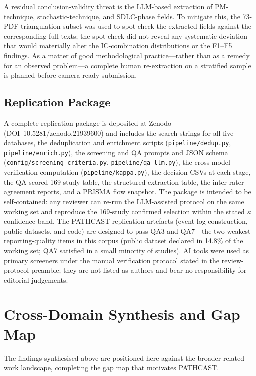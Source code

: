 A residual conclusion-validity threat is the LLM-based extraction of
PM-technique, stochastic-technique, and SDLC-phase fields. To mitigate this,
the 73-PDF triangulation subset was used to spot-check the extracted fields
against the corresponding full texts; the spot-check did not reveal any
systematic deviation that would materially alter the IC-combination
distributions or the F1--F5 findings. As a matter of good methodological
practice---rather than as a remedy for an observed problem---a complete
human re-extraction on a stratified sample is planned before camera-ready
submission.


\subsection{Replication Package}
\label{sec:slr-replication}

A complete replication package is deposited at Zenodo
(DOI~10.5281/zenodo.21939600)
and includes the search strings for all five databases, the deduplication and
enrichment scripts (\texttt{pipeline/dedup.py}, \texttt{pipeline/enrich.py}),
the screening and QA prompts and JSON schema
(\texttt{config/screening\_criteria.py}, \texttt{pipeline/qa\_llm.py}),
the cross-model verification computation (\texttt{pipeline/kappa.py}),
the decision CSVs at each stage, the QA-scored 169-study table, the
structured extraction table, the inter-rater agreement reports, and a
PRISMA flow snapshot. The package is intended to be self-contained: any
reviewer can re-run the LLM-assisted protocol on the same working set and
reproduce the 169-study confirmed selection within the stated $\kappa$
confidence band. The PATHCAST replication artefacts (event-log construction,
public datasets, and code) are designed to pass QA3 and QA7---the two
weakest reporting-quality items in this corpus (public dataset declared in
14.8\% of the working set; QA7 satisfied in a small minority of studies).
AI tools were used as primary screeners under the manual
verification protocol stated in the review-protocol preamble; they are
not listed as authors and bear no responsibility for editorial
judgements.


\section{Cross-Domain Synthesis and Gap Map}
\label{sec:slr-related-work}

The findings synthesised above are positioned here against the broader
related-work landscape, completing the gap map that motivates PATHCAST.

